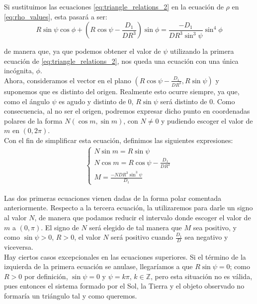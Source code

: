 \documentclass[11pt]{book}
\newcommand\ddfrac[2]{\frac{\displaystyle #1}{\displaystyle #2}}
\begin{document}
Si sustituimos las ecuaciones  \eqref{eq:triangle_relations_2} en la ecuación de $\rho$ en \eqref{eq:rho_values}, esta pasará a ser:
\[
R\sin{\psi}\cos{\phi}+\left(R\cos{\psi}-\ddfrac{D_1}{DR^3}\right)\sin{\phi}=\ddfrac{-D_1}{DR^3\sin^3{\psi}}\sin^4{\phi}
\]

\noindent de manera que, ya que podemos obtener el valor de $\psi$ utilizando la primera ecuación de \eqref{eq:triangle_relations_2}, nos queda una ecuación con una única incógnita, $\phi$.\\

Ahora, consideramos el vector en el plano $(R\cos{\psi}-\ddfrac{D_1}{DR^3},R\sin{\psi})$ y suponemos que es distinto del origen. Realmente esto ocurre siempre, ya que, como el ángulo $\psi$ es agudo y distinto de $0$, $R\sin{\psi}$ será distinto de $0$. Como consecuencia, al no ser el origen, podremos expresar dicho punto en coordenadas polares de la forma $N(\cos{m},\sin{m})$, con $N\neq0$ y pudiendo escoger el valor de $m$ en $(0,2\pi)$.\\

Con el fin de simplificar esta ecuación, definimos las siguientes expresiones:
\begin{align}
\left\{
\begin{array}{l}
	N\sin{m}=R\sin{\psi}\\
	N\cos{m}=R\cos{\psi}-\ddfrac{D_1}{DR^3}\\
	M=\ddfrac{-NDR^3\sin^3{\psi}}{D_1}
\end{array}
\right.
\label{eq:to_simplify}
\end{align}

Las dos primeras ecuaciones vienen dadas de la forma polar comentada anteriormente. Respecto a la tercera ecuación, la utilizaremos para darle un signo al valor $N$, de manera que podamos reducir el intervalo donde escoger el valor de $m$ a $(0,\pi)$. El signo de $N$ será elegido de tal manera que $M$ sea positivo, y como $\sin{\psi}>0$, $R>0$, el valor $N$ será positivo cuando $\ddfrac{D_1}{D}$ sea negativo y viceversa.\\

Hay ciertos casos excepcionales en las ecuaciones superiores. Si el término de la izquierda de la primera ecuación se anulase, llegaríamos a que $R\sin{\psi}=0$; como $R>0$ por definición, $\sin{\psi}=0$ y $\psi=k\pi$, $k\in\mathbb{Z}$, pero esta situación no es válida, pues entonces el sistema formado por el Sol, la Tierra y el objeto observado no formaría un triángulo tal y como queremos.\\
\end{document}
